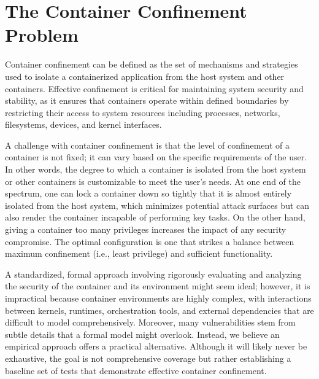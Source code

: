 \section{The Container Confinement Problem}
\label{sec:container-confinment-problem}


Container confinement can be defined as the set of mechanisms and strategies used to isolate a containerized application from the host system and other containers. Effective confinement is critical for maintaining system security and stability, as it ensures that containers operate within defined boundaries by restricting their access to system resources including processes, networks, filesystems, devices, and kernel interfaces. 

A challenge with container confinement is that the level of confinement of a container is not fixed; it can vary based on the specific requirements of the user. In other words, the degree to which a container is isolated from the host system or other containers is customizable to meet the user’s needs. At one end of the spectrum, one can lock a container down so tightly that it is almost entirely isolated from the host system, which minimizes potential attack surfaces but can also render the container incapable of performing key tasks. On the other hand, giving a container too many privileges increases the impact of any security compromise. The optimal configuration is one that strikes a balance between maximum confinement (i.e., least privilege) and sufficient functionality. 

A standardized, formal approach involving rigorously evaluating and analyzing the security of the container and its environment might seem ideal; however, it is impractical because container environments are highly complex, with interactions between kernels, runtimes, orchestration tools, and external dependencies that are difficult to model comprehensively. Moreover, many vulnerabilities stem from subtle details that a formal model might overlook. Instead, we believe an empirical approach offers a practical alternative. Although it will likely never be exhaustive, the goal is not comprehensive coverage but rather establishing a baseline set of tests that demonstrate effective container confinement.

